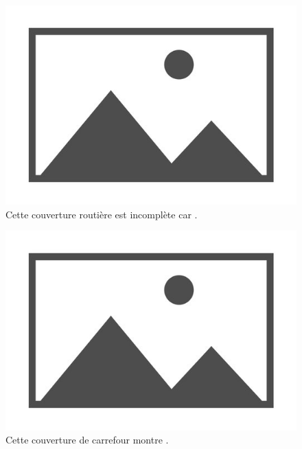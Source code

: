 \begin{figure}
    \centering
    \includegraphics{images/placeholder.jpg}
    \caption{Cette couverture routière est incomplète car \todo{}.}
    \label{fig:mod_ex_couverture_routiere_incomplete}
\end{figure}

\begin{figure}
    \centering
    \includegraphics{images/placeholder.jpg}
    \caption{Cette couverture de carrefour montre \todo{}.}
    \label{fig:mod_ex_couverture_routiere_carrefour}
\end{figure}

